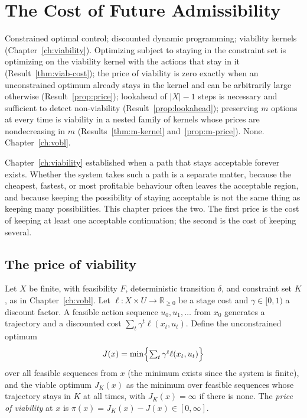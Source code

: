 \chapter{The Cost of Future Admissibility}\label{ch:admcost}
{Constrained optimal control; discounted dynamic programming; viability kernels (Chapter~\ref{ch:viability}).}
{Optimizing subject to staying in the constraint set is optimizing on the viability kernel with the actions that stay in it (Result~\ref{thm:viab-cost}); the price of viability is zero exactly when an unconstrained optimum already stays in the kernel and can be arbitrarily large otherwise (Result~\ref{prop:price}); lookahead of $|X|-1$ steps is necessary and sufficient to detect non-viability (Result~\ref{prop:lookahead}); preserving $m$ options at every time is viability in a nested family of kernels whose prices are nondecreasing in $m$ (Results~\ref{thm:m-kernel} and~\ref{prop:m-price}).}
{None.}
{Chapter~\ref{ch:vobl}.}

Chapter~\ref{ch:viability} established when a path that stays acceptable forever exists. Whether the system takes such a path is a separate matter, because the cheapest, fastest, or most profitable behaviour often leaves the acceptable region, and because keeping the possibility of staying acceptable is not the same thing as keeping many possibilities. This chapter prices the two. The first price is the cost of keeping at least one acceptable continuation; the second is the cost of keeping several.

\section{The price of viability}

Let $X$ be finite, with feasibility $F$, deterministic transition $\delta$, and constraint set $K$, as in Chapter~\ref{ch:vobl}. Let $\ell:X\times U\to\mathbb R_{\ge0}$ be a stage cost and $\gamma\in[0,1)$ a discount factor. A feasible action sequence $u_0,u_1,\dots$ from $x_0$ generates a trajectory and a discounted cost $\sum_t\gamma^t\ell(x_t,u_t)$. Define the unconstrained optimum
\[
J(x)=\min\Bigl\{\textstyle\sum_t\gamma^t\ell(x_t,u_t)\Bigr\}
\]
over all feasible sequences from $x$ (the minimum exists since the system is finite), and the viable optimum $J_K(x)$ as the minimum over feasible sequences whose trajectory stays in $K$ at all times, with $J_K(x)=\infty$ if there is none. The \emph{price of viability} at $x$ is $\pi(x)=J_K(x)-J(x)\in[0,\infty]$.

